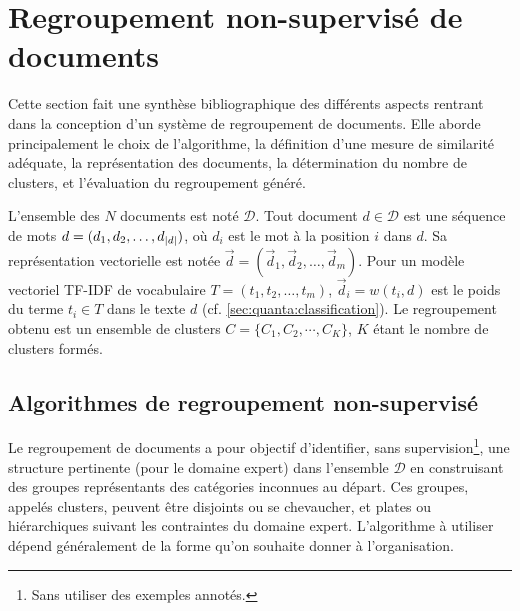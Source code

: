 
\section{Regroupement non-supervisé de documents}
\label{sec:similarite:biblio}

Cette section fait une synthèse bibliographique des différents aspects rentrant dans la conception d'un système de regroupement de documents. Elle aborde principalement le choix de l'algorithme, la définition d'une mesure de similarité adéquate, la représentation des documents, la détermination du nombre de {clusters}, et l'évaluation du regroupement généré.

L'ensemble des $N$ documents est noté $\mathcal{D}$. Tout document $d \in \mathcal{D}$ est une séquence de mots $d=(d_1, d_2, \dots, d_{{\vert d\vert}})$, où $d_i$ est le mot à la position $i$ dans $d$. Sa représentation vectorielle est notée $\vec{d}=(\vec{d}_1, \vec{d}_2, \dots, \vec{d}_m)$. Pour un modèle vectoriel TF-IDF de vocabulaire $T = (t_1, t_2, \dots, t_m)$, $\vec{d}_i = w(t_i,d)$ est le poids du terme $t_i \in T$ dans le texte $d$ ({cf. \ref{sec:quanta:classification}}). Le regroupement obtenu est un ensemble de clusters $C = \lbrace C_1, C_2, \cdots, C_K \rbrace$, $K$ étant le nombre de clusters formés.

\subsection{Algorithmes de regroupement non-supervisé}

Le regroupement de documents a pour objectif  d'identifier, sans supervision\footnote{Sans utiliser des exemples annotés.}, une structure pertinente (pour le domaine expert) dans l'ensemble $\mathcal{D}$ en construisant des groupes représentants des catégories inconnues au départ. Ces groupes, appelés clusters, peuvent être disjoints ou se chevaucher, et plates ou hiérarchiques suivant les contraintes du domaine expert. L’algorithme à utiliser dépend généralement de la forme qu’on souhaite donner à l’organisation. 

